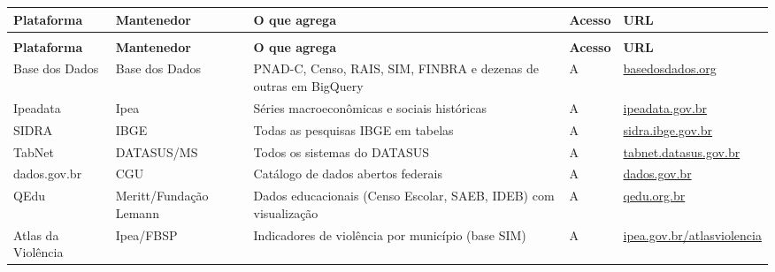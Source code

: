 {\setlength{\tabcolsep}{3pt}\footnotesize\begin{longtable}{@{} >{\raggedright\arraybackslash}p{3cm} >{\raggedright\arraybackslash}p{2.3cm} >{\raggedright\arraybackslash}p{4.2cm} >{\raggedright\arraybackslash}p{1cm} >{\raggedright\arraybackslash}p{3cm} @{}}
\toprule
\textbf{Plataforma} & \textbf{Mantenedor} & \textbf{O que agrega} & \textbf{Acesso} & \textbf{URL} \\
\midrule
\endfirsthead
\multicolumn{5}{l}{\small\textit{(continuação)}} \\
\toprule
\textbf{Plataforma} & \textbf{Mantenedor} & \textbf{O que agrega} & \textbf{Acesso} & \textbf{URL} \\
\midrule
\endhead
\bottomrule
\endfoot

Base dos Dados
  & Base dos Dados
  & PNAD-C, Censo, RAIS, SIM, FINBRA e dezenas de outras em BigQuery
  & A
  & \url{basedosdados.org} \\

Ipeadata
  & Ipea
  & Séries macroeconômicas e sociais históricas
  & A
  & \url{ipeadata.gov.br} \\

SIDRA
  & IBGE
  & Todas as pesquisas IBGE em tabelas
  & A
  & \url{sidra.ibge.gov.br} \\

TabNet
  & DATASUS/MS
  & Todos os sistemas do DATASUS
  & A
  & \url{tabnet.datasus.gov.br} \\

dados.gov.br
  & CGU
  & Catálogo de dados abertos federais
  & A
  & \url{dados.gov.br} \\

QEdu
  & Meritt\slash \allowbreak Fundação Lemann
  & Dados educacionais (Censo Escolar, SAEB, IDEB) com visualização
  & A
  & \url{qedu.org.br} \\

Atlas da Violência
  & Ipea/FBSP
  & Indicadores de violência por município (base SIM)
  & A
  & \url{ipea.gov.br/atlasviolencia} \\

\end{longtable}}
